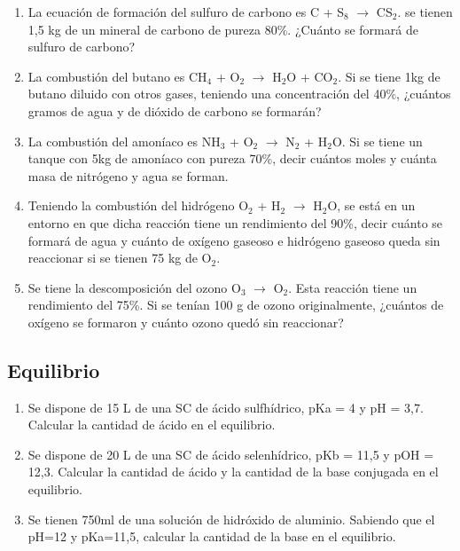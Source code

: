 \begin{enumerate}
\item La ecuación de formación del sulfuro de carbono es C + S$_8$ $\longrightarrow$ CS$_2$. se tienen 1,5 kg de un mineral de carbono de pureza 80\%. ¿Cuánto se formará de sulfuro de carbono?

\item La combustión del butano es CH$_4$ + O$_2$ $\longrightarrow$ H$_2$O + CO$_2$. Si se tiene 1kg de butano diluido con otros gases, teniendo una concentración del 40$\%$, ¿cuántos gramos de agua y de dióxido de carbono se formarán?

\item La combustión del amoníaco es NH$_3$ + O$_2$ $\longrightarrow$ N$_2$ + H$_2$O. Si se tiene un tanque con 5kg de amoníaco con pureza 70\%, decir cuántos moles y cuánta masa de nitrógeno y agua se forman.

\item Teniendo la combustión del hidrógeno O$_2$ + H$_2$ $\longrightarrow$ H$_2$O, se está en un entorno en que dicha reacción tiene un rendimiento del 90\%, decir cuánto se formará de agua y cuánto de oxígeno gaseoso e hidrógeno gaseoso queda sin reaccionar si se tienen 75 kg de O$_2$.

\item Se tiene la descomposición del ozono O$_3$ $\longrightarrow$ O$_2$. Esta reacción tiene un rendimiento del 75\%. Si se tenían 100 g de ozono originalmente, ¿cuántos de oxígeno se formaron y cuánto ozono quedó sin reaccionar?
    
\end{enumerate}

\subsection*{Equilibrio}

\begin{enumerate}
    \item Se dispone de 15 L de una SC de ácido sulfhídrico, pKa = 4 y pH = 3,7. Calcular la cantidad de ácido en el equilibrio.
    \item Se dispone de 20 L de una SC de ácido selenhídrico, pKb = 11,5 y pOH = 12,3. Calcular la cantidad de ácido y la cantidad de la base conjugada en el equilibrio.
    \item Se tienen 750ml de una solución de hidróxido de aluminio. Sabiendo que el pH=12 y pKa=11,5, calcular la cantidad de la base en el equilibrio.
\end{enumerate}